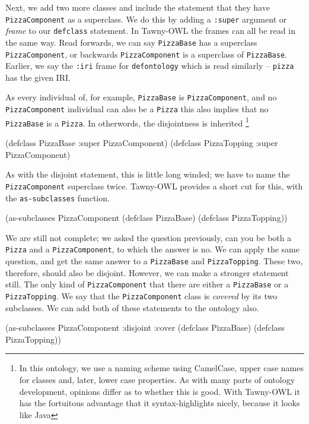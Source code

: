 \documentclass[11pt]{article}
\begin{document}
Next, we add two more classes and include the statement that they have
\verb~PizzaComponent~ as a superclass. We do this by adding a \verb~:super~
argument or \emph{frame} to our \verb~defclass~ statement. In Tawny-OWL the frames
can all be read in the same way. Read forwards, we can say \verb~PizzaBase~
has a superclass \verb~PizzaComponent~, or backwards \verb~PizzaComponent~ is a
superclass of \verb~PizzaBase~. Earlier, we say the \verb~:iri~ frame for
\verb~defontology~ which is read similarly -- \verb~pizza~ has the given IRI.

As every individual of, for example, \verb~PizzaBase~ is \verb~PizzaComponent~, and no
\verb~PizzaComponent~ individual can also be a \verb~Pizza~ this also implies that no
\verb~PizzaBase~ is a \verb~Pizza~. In otherwords, the disjointness is inherited
\footnote{In this ontology, we use a naming scheme using CamelCase, upper case
names for classes and, later, lower case properties. As with many parts of
ontology development, opinions differ as to whether this is good. With
Tawny-OWL it has the fortuitous advantage that it syntax-highlights nicely,
because it looks like Java}

\begin{tawny}
(defclass PizzaBase
  :super PizzaComponent)
(defclass PizzaTopping
  :super PizzaComponent)
\end{tawny}


As with the disjoint statement, this is little long winded; we have to name
the \verb~PizzaComponent~ superclass twice. Tawny-OWL provides a short cut for
this, with the \verb~as-subclasses~ function.

\begin{tawny}
(as-subclasses
 PizzaComponent
 (defclass PizzaBase)
 (defclass PizzaTopping))
\end{tawny}

We are still not complete; we asked the question previously, can you be both a
\verb~Pizza~ and a \verb~PizzaComponent~, to which the answer is no. We can apply the
same question, and get the same answer to a \verb~PizzaBase~ and \verb~PizzaTopping~.
These two, therefore, should also be disjoint. However, we can make a stronger
statement still. The only kind of \verb~PizzaComponent~ that there are either a
\verb~PizzaBase~ or a \verb~PizzaTopping~. We say that the \verb~PizzaComponent~ class is
\emph{covered} by its two subclasses. We can add both of these statements to the
ontology also.

\begin{tawny}
(as-subclasses
 PizzaComponent
 :disjoint :cover
 (defclass PizzaBase)
 (defclass PizzaTopping))
\end{tawny}
\end{document}
